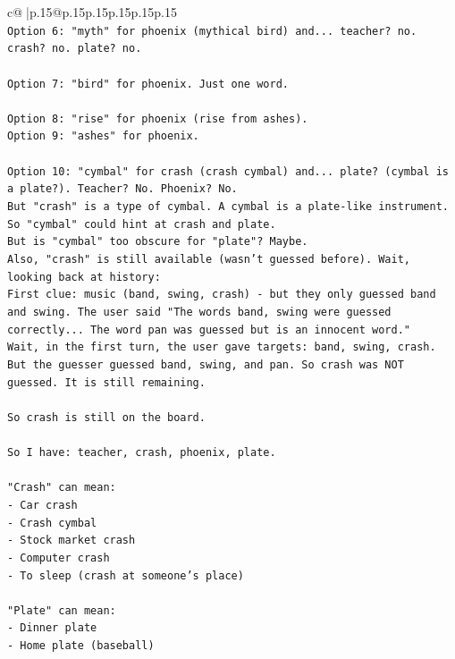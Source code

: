 \documentclass{article}
\begin{document}
{\begin{supertabular}{c@{$\;$}|p{.15\linewidth}@{}p{.15\linewidth}p{.15\linewidth}p{.15\linewidth}p{.15\linewidth}p{.15\linewidth}}
{{{\\ 
\texttt{Option 6: "myth" for phoenix (mythical bird) and... teacher? no. crash? no. plate? no.} \\
\\ 
\texttt{Option 7: "bird" for phoenix. Just one word.} \\
\\ 
\texttt{Option 8: "rise" for phoenix (rise from ashes).} \\
\texttt{Option 9: "ashes" for phoenix.} \\
\\ 
\texttt{Option 10: "cymbal" for crash (crash cymbal) and... plate? (cymbal is a plate?). Teacher? No. Phoenix? No.} \\
\texttt{But "crash" is a type of cymbal. A cymbal is a plate{-}like instrument. So "cymbal" could hint at crash and plate.} \\
\texttt{But is "cymbal" too obscure for "plate"? Maybe.} \\
\texttt{Also, "crash" is still available (wasn't guessed before). Wait, looking back at history:} \\
\texttt{First clue: music (band, swing, crash) {-} but they only guessed band and swing. The user said "The words band, swing were guessed correctly... The word pan was guessed but is an innocent word."} \\
\texttt{Wait, in the first turn, the user gave targets: band, swing, crash. But the guesser guessed band, swing, and pan. So crash was NOT guessed. It is still remaining.} \\
\\ 
\texttt{So crash is still on the board.} \\
\\ 
\texttt{So I have: teacher, crash, phoenix, plate.} \\
\\ 
\texttt{"Crash" can mean:} \\
\texttt{{-} Car crash} \\
\texttt{{-} Crash cymbal} \\
\texttt{{-} Stock market crash} \\
\texttt{{-} Computer crash} \\
\texttt{{-} To sleep (crash at someone's place)} \\
\\ 
\texttt{"Plate" can mean:} \\
\texttt{{-} Dinner plate} \\
\texttt{{-} Home plate (baseball)} \\
}}}
\end{supertabular}}
\end{document}
